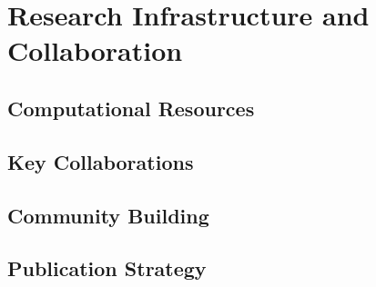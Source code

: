 \documentclass[11pt,a4paper]{article}
\begin{document}
    \section{Research Infrastructure and Collaboration}

    \subsection{Computational Resources}
    
    
    \subsection{Key Collaborations}
    
    
    
    
    \subsection{Community Building}
    
    
    
    \subsection{Publication Strategy}
    
\end{document}
